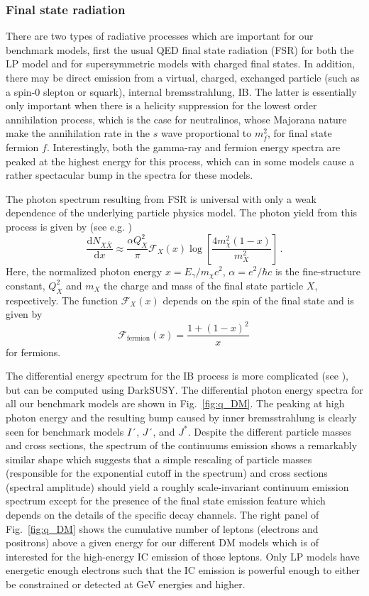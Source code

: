 \documentclass[10pt,aps,pra,reprint,amsmath,amsfonts,amssymb,showpacs,nofootinbib,floatfix]{revtex4-1}
\newcommand{\rmn}{\mathrm}
\newcommand{\dd}{\rmn{d}}
\newcommand{\eg}{E_\gamma}
\begin{document}
\subsubsection{Final state radiation}
There are two types of radiative processes which are important for our
benchmark models, first the usual QED final state radiation (FSR) for
both the LP model and for supersymmetric models with charged final
states. In addition, there may be direct emission from a virtual,
charged, exchanged particle (such as a spin-0 slepton or squark),
internal bremsstrahlung, IB. The latter is essentially only important
when there is a helicity suppression for the lowest order annihilation
process, which is the case for neutralinos, whose Majorana nature make
the annihilation rate in the $s$ wave proportional to $m_f^2$, for
final state fermion $f$. Interestingly, both the gamma-ray and fermion
energy spectra are peaked at the highest energy for this process,
which can in some models cause a rather spectacular bump in the
spectra for these models.

The photon spectrum resulting from FSR is universal with only a
weak dependence of the underlying particle physics model. The photon
yield from this process is given by (see
e.g. \cite{2008JHEP...01..049B})
\begin{equation}
\frac{\dd N_{X \bar{X}}}{\dd x} \approx \frac{\alpha Q_X^2}{\pi}
\mathcal{F}_X(x) \log\left[\frac{4 m_\chi^2\left(1-x\right)}{m_X^2}\right]\,.
\end{equation}
Here, the normalized photon energy $x=\eg/m_\chi c^2$, 
$\alpha =e^2/\hbar c$ is the fine-structure constant, 
$Q_X^2$ and $m_X$ the
charge and mass of the final state particle $X$, respectively. The function
$\mathcal{F}_X(x)$ depends on the spin of the final state and is given
by
\begin{equation}
\mathcal{F}_\rmn{fermion}(x) = \frac{1+\left(1-x\right)^2}{x}\,
\end{equation}
for fermions. 

The differential energy spectrum for the IB process is more
complicated (see \cite{1989PhLB..225..372B,2008JHEP...01..049B}), but
can be computed using {\sc DarkSUSY}. The differential photon energy
spectra for all our benchmark models are shown in Fig.~\ref{fig:q_DM}.
The peaking at high photon energy and the resulting bump caused by
inner bremsstrahlung is clearly seen for benchmark models $I´$, $J´$,
and $J^*$. Despite the different particle masses and cross sections,
the spectrum of the continuums emission shows a remarkably similar
shape which suggests that a simple rescaling of particle masses
(responsible for the exponential cutoff in the spectrum) and cross
sections (spectral amplitude) should yield a roughly scale-invariant
continuum emission spectrum except for the presence of the final state
emission feature which depends on the details of the specific decay
channels. The right panel of Fig.~\ref{fig:q_DM} shows the cumulative
number of leptons (electrons and positrons) above a given energy for
our different DM models which is of interested for the high-energy IC
emission of those leptons. Only LP models have energetic enough
electrons such that the IC emission is powerful enough to either be
constrained or detected at GeV energies and higher.
\end{document}
